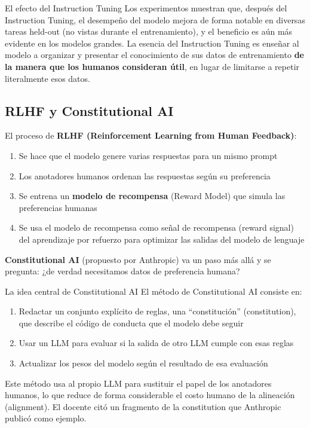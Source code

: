 \begin{importantbox}{El efecto del Instruction Tuning}
Los experimentos muestran que, después del Instruction Tuning, el desempeño del modelo mejora de forma notable en diversas tareas held-out (no vistas durante el entrenamiento), y el beneficio es aún más evidente en los modelos grandes. La esencia del Instruction Tuning es enseñar al modelo a organizar y presentar el conocimiento de sus datos de entrenamiento \textbf{de la manera que los humanos consideran útil}, en lugar de limitarse a repetir literalmente esos datos.
\end{importantbox}

\subsection{RLHF y Constitutional AI}

El proceso de \textbf{RLHF (Reinforcement Learning from Human Feedback)}:
\begin{enumerate}
    \item Se hace que el modelo genere varias respuestas para un mismo prompt
    \item Los anotadores humanos ordenan las respuestas según su preferencia
    \item Se entrena un \textbf{modelo de recompensa} (Reward Model) que simula las preferencias humanas
    \item Se usa el modelo de recompensa como señal de recompensa (reward signal) del aprendizaje por refuerzo para optimizar las salidas del modelo de lenguaje
\end{enumerate}

\textbf{Constitutional AI} (propuesto por Anthropic) va un paso más allá y se pregunta: ¿de verdad necesitamos datos de preferencia humana?

\begin{knowledgebox}{La idea central de Constitutional AI}
El método de Constitutional AI consiste en:
\begin{enumerate}
    \item Redactar un conjunto explícito de reglas, una ``constitución'' (constitution), que describe el código de conducta que el modelo debe seguir
    \item Usar un LLM para evaluar si la salida de otro LLM cumple con esas reglas
    \item Actualizar los pesos del modelo según el resultado de esa evaluación
\end{enumerate}
Este método usa al propio LLM para sustituir el papel de los anotadores humanos, lo que reduce de forma considerable el costo humano de la alineación (alignment). El docente citó un fragmento de la constitution que Anthropic publicó como ejemplo.
\end{knowledgebox}

